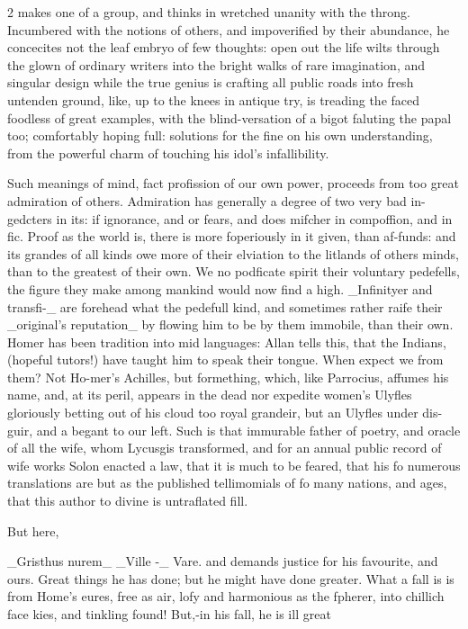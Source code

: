 \documentclass[10pt]{article}
\begin{document}
\begin{multicols}{2}\raggedcolumns
makes one of a group, and thinks in wretched unanity with the throng. Incumbered with the notions of others, and impoverified by their abundance, he concecites not the leaf embryo of few thoughts: open out the life wilts through the glown of ordinary writers into the bright walks of rare imagination, and singular design while the true genius is crafting all public roads into fresh untenden ground, like, up to the knees in antique try, is treading the faced foodless of great examples, with the blind-versation of a bigot faluting the papal too; comfortably hoping full: solutions for the fine on his own understanding, from the powerful charm of touching his idol's infallibility.

Such meanings of mind, fact profission of our own power, proceeds from too great admiration of others. Admiration has generally a degree of two very bad in-gedcters in its: if ignorance, and or fears, and does mifcher in compoffion, and in fic. Proof as the world is, there is more foperiously in it given, than af-funds: and its grandes of all kinds owe more of their elviation to the litlands of others minds, than to the greatest of their own. We no podficate spirit their voluntary pedefells, the figure they make among mankind would now find a high. \_Infinityer and transfi-\_ are forehead what the pedefull kind, and sometimes rather raife their \_original’s reputation\_ by flowing him to be by them immobile, than their own. Homer has been tradition into mid languages: Allan tells this, that the Indians, (hopeful tutors!) have taught him to speak their tongue. When expect we from them? Not Ho-mer's Achilles, but formething, which, like Parrocius, affumes his name, and, at its peril, appears in the dead nor expedite women’s Ulyfles gloriously betting out of his cloud too royal grandeir, but an Ulyfles under dis-guir, and a begant to our left. Such is that immurable father of poetry, and oracle of all the wife, whom Lycusgis transformed, and for an annual public record of wife works Solon enacted a law, that it is much to be feared, that his fo numerous translations are but as the published tellimomials of fo many nations, and ages, that this author to divine is untraflated fill.

But here,

\_Gristhus nurem\_ \_Ville -\_ Vare. and demands justice for his favourite, and ours. Great things he has done; but he might have done greater. What a fall is is from Home’s eures, free as air, lofy and harmonious as the fpherer, into chillich face kies, and tinkling found! But,-in his fall, he is ill great


\end{multicols}
\end{document}
